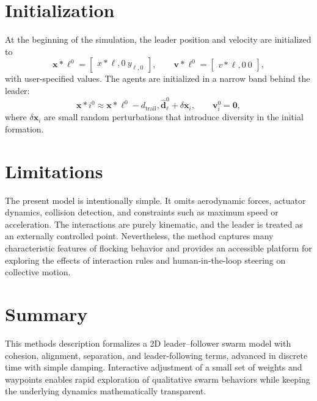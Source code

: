 \documentclass[12pt]{article}
\begin{document}
\section{Initialization}
At the beginning of the simulation, the leader position and velocity are initialized to
\begin{equation}
\mathbf{x}*\ell^0 = \begin{bmatrix} x*{\ell,0} \ y_{\ell,0} \end{bmatrix}, \qquad
\mathbf{v}*\ell^0 = \begin{bmatrix} v*{\ell,0} \ 0 \end{bmatrix},
\end{equation}
with user-specified values. The agents are initialized in a narrow band behind the leader:
\begin{equation}
\mathbf{x}*i^0 \approx \mathbf{x}*\ell^0 - d_\mathrm{trail},\hat{\mathbf{d}}_\ell^0 + \delta \mathbf{x}_i, \qquad \mathbf{v}_i^0 = \mathbf{0},
\end{equation}
where $\delta \mathbf{x}_i$ are small random perturbations that introduce diversity in the initial formation.

\section{Limitations}
The present model is intentionally simple. It omits aerodynamic forces, actuator dynamics, collision detection, and constraints such as maximum speed or acceleration. The interactions are purely kinematic, and the leader is treated as an externally controlled point. Nevertheless, the method captures many characteristic features of flocking behavior and provides an accessible platform for exploring the effects of interaction rules and human-in-the-loop steering on collective motion.

\section{Summary}
This methods description formalizes a 2D leader--follower swarm model with cohesion, alignment, separation, and leader-following terms, advanced in discrete time with simple damping. Interactive adjustment of a small set of weights and waypoints enables rapid exploration of qualitative swarm behaviors while keeping the underlying dynamics mathematically transparent.
\end{document}
